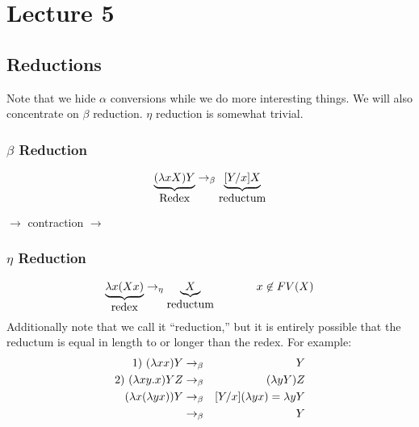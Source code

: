 \chapter{Lecture 5}

\section{Reductions}
Note that we hide $\alpha$ conversions while we do more interesting things. We will also concentrate on $\beta$ reduction. $\eta$ reduction is somewhat trivial.
\subsection{$\beta$ Reduction}
\begin{equation*}
  \underbrace{(\lambda xX)Y}_{\hbox{Redex}} \rightarrow_\beta \underbrace{[Y / x]X}_{\hbox{reductum}}
\end{equation*}
{\begin{center} $\rightarrow$ contraction $\rightarrow$ \end{center}}
\subsection{$\eta$ Reduction}
\begin{equation*}
  \underbrace{\lambda x(Xx)}_{\hbox{redex}} \rightarrow_\eta \underbrace{X}_{\hbox{reductum}} \hspace{.5in} x \not\in FV(X)
\end{equation*}
 Additionally note that we call it ``reduction,'' but it is entirely possible that the reductum is equal in length to or longer than the redex. For example:
\begin{eqnarray*}
  1)\ (\lambda x x)Y &\rightarrow_\beta& Y\\
  2)\ (\lambda xy.x)YZ &\rightarrow_\beta& (\lambda yY)Z\\
  (\lambda x (\lambda yx))Y &\rightarrow_\beta& [Y/x](\lambda yx) = \lambda yY\\
  &\rightarrow_\beta& Y
\end{eqnarray*}

